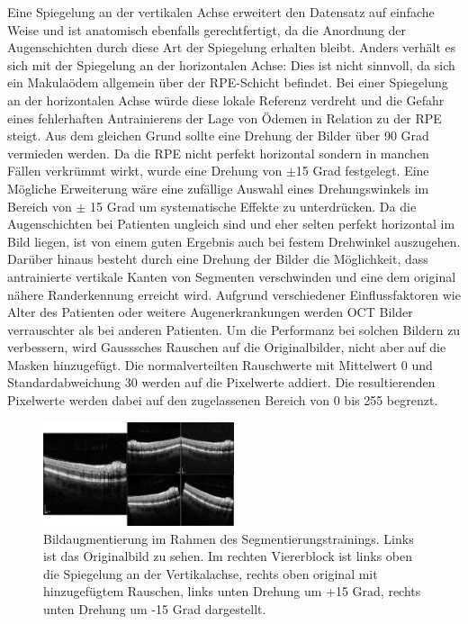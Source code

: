 Eine Spiegelung an der vertikalen Achse erweitert den Datensatz auf einfache Weise und ist anatomisch ebenfalls gerechtfertigt, da die Anordnung der Augenschichten durch diese Art der Spiegelung erhalten bleibt. Anders verhält es sich mit der Spiegelung an der horizontalen Achse: Dies ist nicht sinnvoll, da sich ein Makulaödem allgemein über der RPE-Schicht befindet. Bei einer Spiegelung an der horizontalen Achse würde diese lokale Referenz verdreht und die Gefahr eines fehlerhaften Antrainierens der Lage von Ödemen in Relation zu der RPE steigt. Aus dem gleichen Grund sollte eine Drehung der Bilder über 90 Grad vermieden werden. Da die RPE nicht perfekt horizontal sondern in manchen Fällen verkrümmt wirkt, wurde eine Drehung von  $\pm$15 Grad festgelegt. Eine Mögliche Erweiterung wäre eine zufällige Auswahl eines Drehungswinkels im Bereich von $\pm$ 15 Grad um systematische Effekte zu unterdrücken. Da die Augenschichten bei Patienten ungleich sind und eher selten perfekt horizontal im Bild liegen, ist von einem guten Ergebnis auch bei festem Drehwinkel auszugehen. Darüber hinaus besteht durch eine Drehung der Bilder die Möglichkeit, dass antrainierte vertikale Kanten von Segmenten verschwinden und eine dem original nähere Randerkennung erreicht wird. Aufgrund verschiedener Einflussfaktoren wie Alter des Patienten oder weitere Augenerkrankungen werden OCT Bilder verrauschter als bei anderen Patienten. Um die Performanz bei solchen Bildern zu verbessern, wird Gausssches Rauschen auf die Originalbilder, nicht aber auf die Masken hinzugefügt. Die normalverteilten Rauschwerte mit Mittelwert 0 und Standardabweichung 30 werden auf die Pixelwerte addiert. Die resultierenden Pixelwerte werden dabei auf den zugelassenen Bereich von 0 bis 255 begrenzt.
\begin{figure}[h]
\centering
\includegraphics[width=0.5\textwidth]{./pic/Segmentierung/segm_augmentiert.png}
\caption{\label{fig:segm_augmentiert} Bildaugmentierung im Rahmen des Segmentierungstrainings. Links ist das Originalbild zu sehen. Im rechten Viererblock ist links oben die Spiegelung an der Vertikalachse, rechts oben original mit hinzugefügtem Rauschen, links unten Drehung um +15 Grad, rechts unten Drehung um -15 Grad dargestellt.}
\end{figure}


